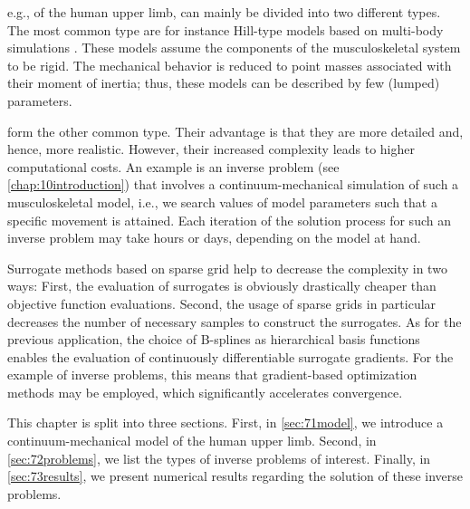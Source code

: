 
\label{chap:70muscle}

e.g., of the human upper limb, can mainly be divided into two different types.
The most common type are 
for instance Hill-type models based on multi-body simulations
.
These models assume the components of the musculoskeletal system
to be rigid.
The mechanical behavior is reduced to point masses
associated with their moment of inertia;
thus, these models can be described by few (lumped) parameters.

 form the other common type.
Their advantage is that they are more detailed and, hence, more realistic.
However, their increased complexity leads to higher computational costs.
An example is an inverse problem (see \cref{chap:10introduction})
that involves a continuum-mechanical simulation of such a
musculoskeletal model,
i.e., we search values of model parameters
such that a specific movement is attained.
Each iteration of the solution process for such an inverse problem
may take hours or days, depending on the model at hand.

Surrogate methods based on sparse grid help to decrease the complexity
in two ways:
First, the evaluation of surrogates is obviously drastically cheaper
than objective function evaluations.
Second, the usage of sparse grids in particular decreases the number
of necessary samples to construct the surrogates.
As for the previous application,
the choice of B-splines as hierarchical basis functions enables
the evaluation of continuously differentiable surrogate gradients.
For the example of inverse problems, this means that
gradient-based optimization methods may be employed,
which significantly accelerates convergence.

This chapter is split into three sections.
First, in \cref{sec:71model}, we introduce a continuum-mechanical
model of the human upper limb.
Second, in \cref{sec:72problems}, we list the types of inverse problems
of interest.
Finally, in \cref{sec:73results}, we present numerical results
regarding the solution of these inverse problems.

